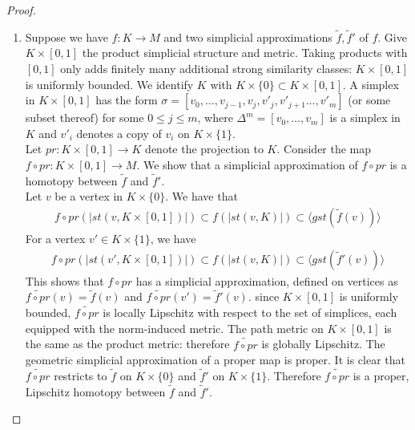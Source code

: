 \documentclass[a4paper,11pt]{article}
\theoremstyle{definition}
\theoremstyle{plain}
\theoremstyle{remark}
\begin{document}
{\begin{proof}
\begin{enumerate}


 


\item Suppose we have $f:K\rightarrow M$ and two simplicial approximations $\tilde{f},\tilde{f}'$ of $f$. Give $K \times [0,1]$ the product simplicial structure and metric. Taking products with $[0,1]$ only adds finitely many additional strong similarity classes: $K\times [0,1]$ is uniformly bounded. We identify $K$ with $K \times \{0\} \subset K\times [0,1]$. A simplex in $K\times [0,1]$ has the form $\sigma = [v_0, \dots, v_{j-1}, v_j, v'_j, v'_{j+1} \dots, v'_{m}]$ (or some subset thereof) for some $0\leq j\leq m$, where $\Delta^m= [v_0,\dots, v_m]$ is a simplex in $K$ and $v'_i$ denotes a copy of $v_i$ on $K \times \{1\}$.\\

Let $pr: K\times [0,1] \rightarrow K$ denote the projection to $K$. Consider the map $f\circ pr: K \times [0,1] \rightarrow M$. We show that a simplicial approximation of $f\circ pr$ is a homotopy between $\tilde{f}$ and $\tilde{f}'$. \\

Let $v$ be a vertex in $K \times \{0\}$. We have that 
\begin{align*}
f \circ pr(|st(v,K\times [0,1])|) \subset f(|st(v,K)|) \subset \langle gst(\tilde{f}(v)) \rangle 
\end{align*} 
For a vertex $v' \in K \times \{1\}$, we have
\begin{align*}
f \circ pr(|st(v',K\times [0,1])|) \subset f(|st(v,K)|) \subset \langle gst(\tilde{f}'(v)) \rangle 
\end{align*} 
This shows that $f\circ pr$ has a simplicial approximation, defined on vertices as $\widetilde{f\circ pr}(v)= \tilde{f}(v)$ and $\widetilde{f\circ pr}(v')= \tilde{f}'(v)$. since $K \times [0,1]$ is uniformly bounded, $\widetilde{f\circ pr}$ is locally Lipschitz with respect to the set of simplices, each equipped with the norm-induced metric. The path metric on $K \times [0,1]$ is the same as the product metric: therefore $\widetilde{f\circ pr}$ is globally Lipschitz. The geometric simplicial approximation of a proper map is proper. It is clear that $\widetilde{f\circ pr}$ restricts to $\tilde{f}$ on $K \times \{0\}$ and $\tilde{f}'$ on $K \times \{1\}$. Therefore $\widetilde{f\circ pr}$ is a proper, Lipschitz homotopy between $\tilde{f}$ and $\tilde{f}'.$\\


\end{enumerate}
\end{proof}}
\end{document}
